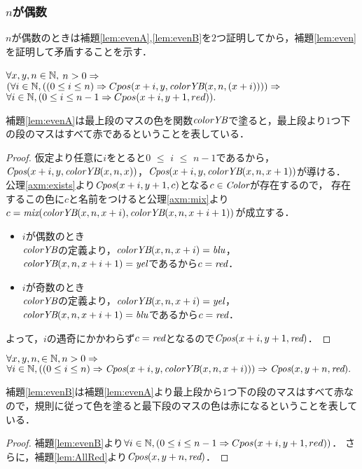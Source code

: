 \subsubsection{$n$が偶数}
$n$が偶数のときは補題\ref{lem:evenA},\ref{lem:evenB}を$2$つ証明してから，補題\ref{lem:even}を証明して矛盾することを示す．
\begin{lem}[\EvenA] \label{lem:evenA}
  $\forall x, y, n \in \mathbb{N},$
  $n > 0 \Rightarrow$
  $(\forall i \in \mathbb{N}, ((0 \leq i \leq n) \Rightarrow Cpos(x+i,y,\textit{colorYB}(x,n,(x+i)))) \Rightarrow$
  $\forall i \in \mathbb{N}, (0 \leq i \leq n-1 \Rightarrow Cpos(x+i,y+1,red)).$
\end{lem}
補題\ref{lem:evenA}は最上段のマスの色を関数$\textit{colorYB}$で塗ると，最上段より$1$つ下の段のマスはすべて赤であるということを表している．
\begin{proof}
  仮定より任意に$i$をとると$0$ $\leq$ $i$ $\leq$ $n-1$であるから，
  $\textit{Cpos}(x+i,y,\textit{colorYB}(x,n,x))$，$\textit{Cpos}(x+i,y,\textit{colorYB}(x,n,x+1))$が導ける．
  公理\ref{axm:exists}より$\textit{Cpos}(x+i,y+1,c)$となる$c\in\textit{Color}$が存在するので，
  存在するこの色に$c$と名前をつけると公理\ref{axm:mix}より$c=\textit{mix}(\textit{colorYB}(x,n,x+i),\textit{colorYB}(x,n,x+i+1))$が成立する．
  \begin{itemize}
  \item
    $i$が偶数のとき \\
    $\textit{colorYB}$の定義より，$\textit{colorYB}(x,n,x+i)=\textit{blu}$，$\textit{colorYB}(x,n,x+i+1)=\textit{yel}$であるから$c=\textit{red}$．
  \item
    $i$が奇数のとき \\
    $\textit{colorYB}$の定義より，$\textit{colorYB}(x,n,x+i)=\textit{yel}$，$\textit{colorYB}(x,n,x+i+1)=\textit{blu}$であるから$c=\textit{red}$．
  \end{itemize}
  よって，$i$の遇奇にかかわらず$c=\textit{red}$となるので$\textit{Cpos}(x+i,y+1,\textit{red})$．
\end{proof}
\begin{lem}[\EvenB] \label{lem:evenB}
  $\forall x, y, n, \in \mathbb{N}, n > 0 \Rightarrow$
  $\forall i \in \mathbb{N}, ((0 \leq i \leq n) \Rightarrow \textit{Cpos}(x+i,y,\textit{colorYB}(x,n,x+i))) \Rightarrow \textit{Cpos}(x,y+n,\textit{red}).$
\end{lem}
補題\ref{lem:evenB}は補題\ref{lem:evenA}より最上段から$1$つ下の段のマスはすべて赤なので，規則に従って色を塗ると最下段のマスの色は赤になるということを表している．
\begin{proof}
  補題\ref{lem:evenB}より$\forall i \in \mathbb{N}, (0 \leq i \leq n-1 \Rightarrow Cpos(x+i,y+1,red))$．
  さらに，補題\ref{lem:AllRed}より$\textit{Cpos}(x,y+n,\textit{red})$．
\end{proof}

